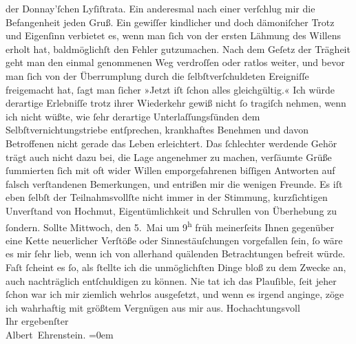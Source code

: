 \begin{ledgroupsized}[t]{13cm}
               der Donnay’ſchen {\pb}Lyſiſtrata. Ein anderesmal nach einer \label{K_L01840_2v}\label{K_L01840_2h} verſchlug mir die Befangenheit jeden
               Gruß. Ein gewiſſer kindlicher und doch dämoniſcher Trotz und Eigenſinn verbietet es,
               wenn man ſich von der ersten Lähmung des Willens erholt hat, baldmöglichſt den Fehler
               gutzumachen. Nach dem Geſetz der Trägheit geht man den einmal genommenen Weg
               verdroſſen oder ratlos weiter, und bevor man ſich von der Überrumplung durch die
               ſelbſtverſchuldeten Ereigniſſe freigemacht hat, ſagt man ſicher »Jetzt iſt ſchon
               alles gleichgültig.« Ich würde derartige Erlebniſſe trotz ihrer Wiederkehr gewiß
               nicht ſo tragiſch nehmen, wenn ich nicht wüßte, wie ſehr derartige
               Unterlaſſungsſünden dem Selbſtvernichtungstriebe entſprechen, krankhaftes Benehmen
               und davon Betroffenen nicht gerade das Leben erleichtert. Das ſchlechter werdende
               Gehör trägt auch nicht dazu bei, {\pb}die Lage
               angenehmer zu machen, verſäumte Grüße ſummierten ſich mit oft wider Willen
               emporgefahrenen biſſigen Antworten auf falsch verſtandenen Bemerkungen, und entrißen
               mir die wenigen Freunde. Es iſt eben ſelbſt der Teilnahmsvollſte nicht immer in der
               Stimmung, kurzſichtigen Unverſtand von Hochmut, Eigentümlichkeit und Schrullen von
               Überhebung zu ſondern. Sollte Mittwoch, den 5. Mai um 9\textsuperscript{h} früh meinerſeits Ihnen gegenüber eine Kette
               neuerlicher Verſtöße oder Sinnestäuſchungen vorgefallen ſein, ſo wäre es mir ſehr
               lieb, wenn ich von allerhand quälenden Betrachtungen befreit würde. Faſt ſcheint es
               ſo, als ſtellte ich die unmöglichſten Dinge bloß zu dem Zwecke an, auch nachträglich
               entſchuldigen zu können. Nie tat ich das Plauſible, ſeit jeher ſchon war ich mir
               ziemlich wehrlos ausgeſetzt, und wenn es irgend anginge, zöge ich {\pb}wahrhaftig mit größtem Vergnügen aus mir
               aus.\pend
           \pstart
           Hochachtungsvoll{\\[\baselineskip]}Ihr ergebenſter{\\[\baselineskip]}\spacefill\mbox{Albert Ehrenstein.}\pend
           \leftskip=0em{}
         

\end{ledgroupsized}
